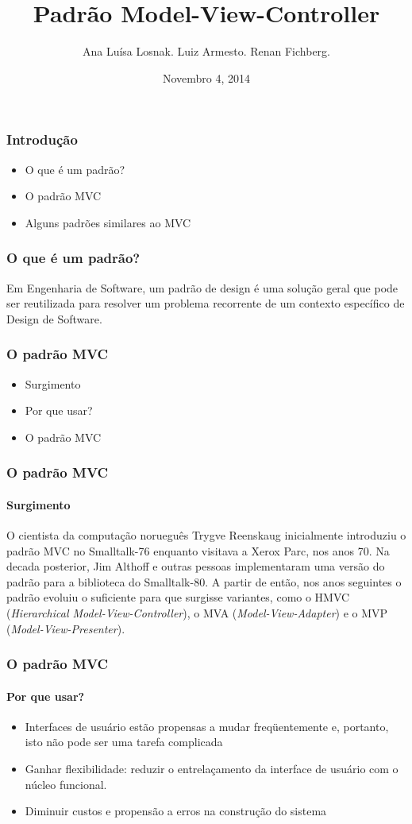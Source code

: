 \documentclass{beamer}
\title[Padrão Model-View-Controller]{Padrão Model-View-Controller}
\author{Ana Luísa Losnak. Luiz Armesto. Renan Fichberg.}
\date{Novembro 4, 2014}
\institute{Instituto de Matemática e Estatística da Universidade de São Paulo (IME-USP)}
\begin{document}
\begin{frame}
\titlepage
\end{frame}

\begin{frame}
\frametitle{Introdução}
\begin{itemize}
	\item O que é um padrão?
	\item O padrão MVC
	\item Alguns padrões similares ao MVC
\end{itemize}
\end{frame}

\begin{frame}
\frametitle{O que é um padrão?}
	Em Engenharia de Software, um padrão de design é uma solução geral que pode ser reutilizada para resolver um problema recorrente de um contexto específico de Design de Software.
\end{frame}

\begin{frame}
\frametitle{O padrão MVC}
\begin{itemize}
	\item Surgimento
	\item Por que usar?
	\item O padrão MVC
\end{itemize}
\end{frame}

\begin{frame}
\frametitle{O padrão MVC}
\framesubtitle{Surgimento}
	O cientista da computação norueguês Trygve Reenskaug inicialmente introduziu o padrão MVC no Smalltalk-76 enquanto visitava a Xerox Parc, nos anos 70. Na decada posterior, Jim Althoff e outras pessoas implementaram uma versão do padrão para a biblioteca do Smalltalk-80. A partir de então, nos anos seguintes o padrão evoluiu o suficiente para que surgisse variantes, como o HMVC (\textit{Hierarchical Model-View-Controller}), o MVA (\textit{Model-View-Adapter}) e o MVP (\textit{Model-View-Presenter}).
\end{frame}

\begin{frame}
\frametitle{O padrão MVC}
\framesubtitle{Por que usar?}
\begin{itemize}
	\item Interfaces de usuário estão propensas a mudar freqüentemente e, portanto, isto não pode ser uma tarefa complicada
	\item Ganhar flexibilidade: reduzir o entrelaçamento da interface de usuário com o núcleo funcional.
	\item Diminuir custos e propensão a erros na construção do sistema
\end{itemize}
\end{frame}
\end{document}
